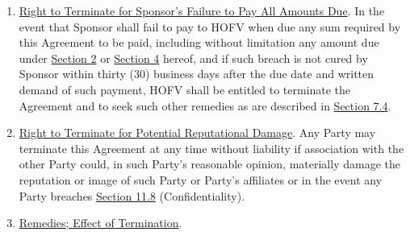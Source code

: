 \documentclass{article}
\begin{document}
\begin{enumerate}
\def\labelenumi{\arabic{enumi}.}
\setcounter{enumi}{1}
\item
  \uline{Right to Terminate for Sponsor's Failure to Pay All Amounts
  Due}. In the event that Sponsor shall fail to pay to HOFV when due any
  sum required by this Agreement to be paid, including without
  limitation any amount due under \uline{Section 2} or \uline{Section 4}
  hereof, and if such breach is not cured by Sponsor within thirty (30)
  business days after the due date and written demand of such payment,
  HOFV shall be entitled to terminate the Agreement and to seek such
  other remedies as are described in \uline{Section 7.4}.
\item
  \uline{Right to Terminate for Potential Reputational Damage}. Any
  Party may terminate this Agreement at any time without liability if
  association with the other Party could, in such Party's reasonable
  opinion, materially damage the reputation or image of such Party or
  Party's affiliates or in the event any Party breaches \uline{Section
  11.8} (Confidentiality).
\item
  \uline{Remedies; Effect of Termination}.


\end{enumerate}
\end{document}
